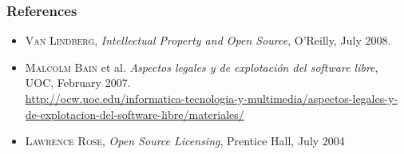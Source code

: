 \begin{frame}
\frametitle{References}

\begin{itemize}
\item \textsc{Van Lindberg}, \textit{Intellectual Property and Open Source}, O'Reilly, July 2008.
\item \textsc{Malcolm Bain} et al. \textit{Aspectos legales y de explotación del software libre}, UOC, February 2007. \\
\url{http://ocw.uoc.edu/informatica-tecnologia-y-multimedia/aspectos-legales-y-de-explotacion-del-software-libre/materiales/}
\item \textsc{Lawrence Rose}, \textit{Open Source Licensing}, Prentice Hall, July 2004 

\end{itemize}

\end{frame}





